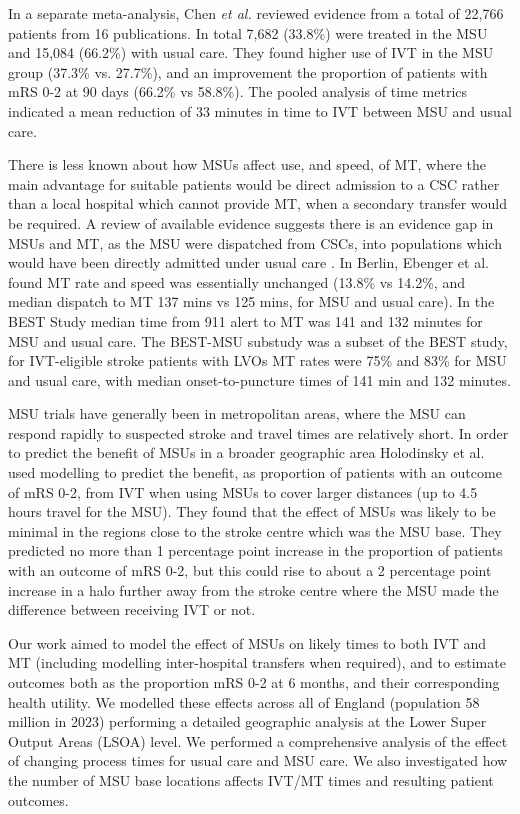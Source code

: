 In a separate meta-analysis, Chen \textit{et al.} \cite{chen_systematic_2022} reviewed evidence from a total of 22,766 patients from 16 publications. In total 7,682 (33.8\%) were treated in the MSU and 15,084 (66.2\%) with usual care. They found higher use of IVT in the MSU group (37.3\% vs. 27.7\%), and an improvement the proportion of patients with mRS 0-2 at 90 days (66.2\% vs 58.8\%).  The pooled analysis of time metrics indicated a mean reduction of 33 minutes in time to IVT between MSU and usual care.

There is less known about how MSUs affect use, and speed, of MT, where the main advantage for suitable patients would be direct admission to a CSC rather than a local hospital which cannot provide MT, when a secondary transfer would be required. A review of available evidence suggests there is an evidence gap in MSUs and MT, as the MSU were dispatched from CSCs, into populations which would have been directly admitted under usual care \cite{navi_mobile_2022}. In Berlin, Ebenger et al. \cite{ebinger_association_2021} found MT rate and speed was essentially unchanged (13.8\% vs 14.2\%, and median dispatch to MT 137 mins vs 125 mins, for MSU and usual care). In the BEST Study \cite{grotta_prospective_2021} median time from 911 alert to MT was 141 and 132 minutes for MSU and usual care. The BEST-MSU substudy \cite{czap_abstract_2022} was a subset of the BEST study, for IVT-eligible stroke patients with LVOs MT rates were 75\% and 83\% for MSU and usual care,  with median onset-to-puncture times of 141 min and 132 minutes.


MSU trials have generally been in metropolitan areas, where the MSU can respond rapidly to suspected stroke and travel times are relatively short. In order to predict the benefit of MSUs in a broader geographic area Holodinsky et al. \cite{holodinsky_jessalyn_k_what_2020} used modelling to predict the benefit, as proportion of patients with an outcome of mRS 0-2, from IVT when using MSUs to cover larger distances (up to 4.5 hours travel for the MSU). They found that the effect of MSUs was likely to be  minimal in the regions close to the stroke centre which was the MSU base. They predicted no more than 1 percentage point increase in the proportion of patients with an outcome of mRS 0-2, but this could rise to about a 2 percentage point increase in a halo further away from the stroke centre where the MSU made the difference between receiving IVT or not.


Our work aimed to model the effect of MSUs on likely times to both IVT and MT (including modelling inter-hospital transfers when required), and to estimate outcomes both as the proportion mRS 0-2 at 6 months, and their corresponding health utility. We modelled these effects across  all of England (population 58 million in 2023) performing a detailed geographic analysis at the Lower Super Output Areas (LSOA) level. We performed a comprehensive analysis of the effect of changing process times for usual care and MSU care. We also investigated how the number of MSU base locations affects IVT/MT times and resulting patient outcomes.